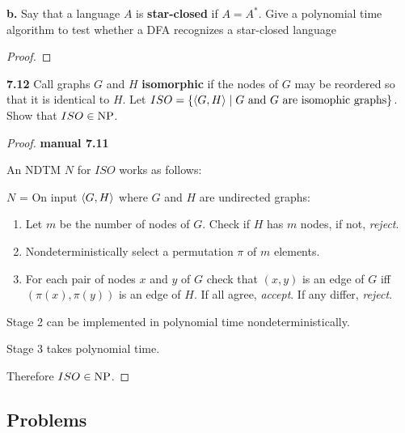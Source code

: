 \textbf{b.} Say that a language $A$ is \textbf{star-closed} if $A = A^*$. Give a polynomial time algorithm to test whether a DFA recognizes a star-closed language
\begin{mdframed}
\begin{proof}

\end{proof}
\end{mdframed}

\textbf{7.12} Call graphs $G$ and $H$ \textbf{isomorphic} if the nodes of $G$ may be reordered so that it is identical to $H$. Let $ISO = \{ \langle{G, H}\rangle \mid \text{$G$ and $G$ are isomophic graphs}\}$. Show that $ISO \in \text{NP}$.
\begin{mdframed}
\begin{proof}
\textbf{manual 7.11}

An NDTM $N$ for $ISO$ works as follows:

\medskip
$N$ = On input $\langle{G, H}\rangle$ where $G$ and $H$ are undirected graphs:
\begin{enumerate}
\item Let $m$ be the number of nodes of $G$. Check if $H$ has $m$ nodes, if not, \textit{reject}.
\item Nondeterministically select a permutation $\pi$ of $m$ elements.
\item For each pair of nodes $x$ and $y$ of $G$ check that $(x, y)$ is an edge of $G$ iff $(\pi(x), \pi(y))$ is an edge of $H$. If all agree, \textit{accept}. If any differ, \textit{reject}.
\end{enumerate}

Stage 2 can be implemented in polynomial time nondeterministically.

Stage 3 takes polynomial time.

Therefore $ISO \in \text{NP}$.
\end{proof}
\end{mdframed}

\subsection{Problems}

